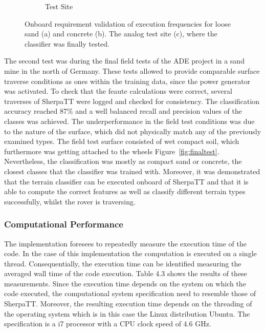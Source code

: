 \documentclass{article}
\begin{document}
\begin{figure}[!htb]
\begin{subfigure}[t]{0.32\textwidth}
        \caption{Test Site}
    \end{subfigure}
    \caption{Onboard requirement validation of execution frequencies for loose sand (a) and concrete (b). The analog test site (c), where the classifier was finally tested.}
    \label{fig:sh-tests}
\end{figure}

The second test was during the final field tests of the ADE project \cite{ocon2021} in a sand mine in the north of Germany.
These tests allowed to provide comparable surface traverse conditions as ones within the training data, since the power generator was activated.
To check that the feaute calculations were correct, several traverses of SherpaTT were logged and checked for consistency. 
The classification accuracy reached 87\% and a well balanced recall and precision values of the classes was achieved. 
The underperformance in the field test conditions was due to the nature of the surface, which did not physically match any of the previously examined types. 
The field test surface consisted of wet compact soil, which furthermore was getting attached to the wheels Figure~\ref{fig:finaltest}.
Nevertheless, the classification was mostly as compact sand or concrete, the closest classes that the classifier was trained with.
Moreover, it was demonstrated that the terrain classifier can be executed onboard of SherpaTT and that it is able to compute the correct features as well as classify different terrain types successfully, whilst the rover is traversing.


\subsubsection{Computational Performance}


The implementation foresees to repeatedly measure the execution time of the code. In the case of this implementation the computation is executed on a single thread. Consequentially, the execution time can be identified measuring the averaged wall time of the code execution. Table 4.3 shows the results of these measurements. Since the execution time depends on the system on which the code executed, the computational system specification need to resemble those of SherpaTT. Moreover, the resulting execution time depends
on the threading of the operating system which is in this case the Linux distribution Ubuntu. The specification is a i7 processor with a CPU clock speed of 4.6 GHz. 
\end{document}
